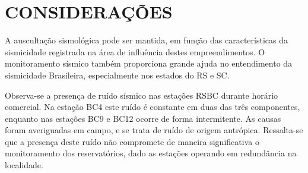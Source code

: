 \section{CONSIDERAÇÕES}
\par{A auscultação sismológica pode ser mantida, em função das características da sismicidade registrada na área de influência destes empreendimentos. O monitoramento sísmico também proporciona grande ajuda no entendimento da sismicidade Brasileira, especialmente nos estados do RS e SC.}\\
\par{Observa-se a presença de ruído sísmico nas estações RSBC durante horário comercial.  Na estação BC4 este ruído é constante em duas das três componentes, enquanto nas estações BC9 e BC12 ocorre de forma intermitente. As causas foram averiguadas em campo, e se trata de ruído de origem antrópica. Ressalta-se que a presença deste ruído não compromete de maneira significativa o monitoramento dos reservatórios, dado as estações operando em redundância na localidade.}\\

\assinaturaLucas
